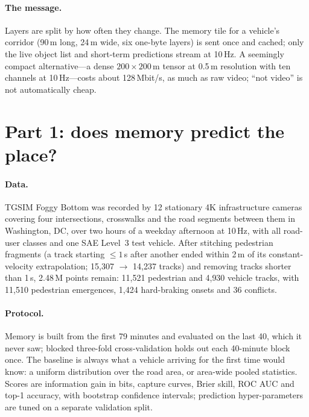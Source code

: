 \documentclass[11pt,a4paper]{article}
\begin{document}
\paragraph{The message.}
Layers are split by how often they change.
The memory tile for a vehicle's corridor (90\,m long, 24\,m wide, six one-byte layers) is sent once and cached; only the live object list and short-term predictions stream at 10\,Hz.
A seemingly compact alternative---a dense $200\times200$\,m tensor at 0.5\,m resolution with ten channels at 10\,Hz---costs about 128\,Mbit/s, as much as raw video; ``not video'' is not automatically cheap.

\section{Part 1: does memory predict the place?}
\label{sec:real}

\paragraph{Data.}
TGSIM Foggy Bottom \citep{tgsim_fb} was recorded by 12 stationary 4K infrastructure cameras covering four intersections, crosswalks and the road segments between them in Washington, DC, over two hours of a weekday afternoon at 10\,Hz, with all road-user classes and one SAE Level~3 test vehicle.
After stitching pedestrian fragments (a track starting $\le 1$\,s after another ended within 2\,m of its constant-velocity extrapolation; 15{,}307 $\to$ 14{,}237 tracks) and removing tracks shorter than 1\,s, 2.48\,M points remain: 11{,}521 pedestrian and 4{,}930 vehicle tracks, with 11{,}510 pedestrian emergences, 1{,}424 hard-braking onsets and 36 conflicts.

\paragraph{Protocol.}
Memory is built from the first 79 minutes and evaluated on the last 40, which it never saw; blocked three-fold cross-validation holds out each 40-minute block once.
The baseline is always what a vehicle arriving for the first time would know: a uniform distribution over the road area, or area-wide pooled statistics.
Scores are information gain in bits, capture curves, Brier skill, ROC AUC and top-1 accuracy, with bootstrap confidence intervals; prediction hyper-parameters are tuned on a separate validation split.
\end{document}
